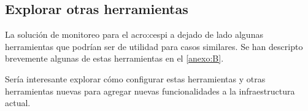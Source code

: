 \subsection{Explorar otras herramientas}
\label{explorar-otras-herramientas}

La solución de monitoreo para el \gls{acro:cespi} a dejado de lado algunas
herramientas que podrían ser de utilidad para casos similares. Se han descripto
brevemente algunas de estas herramientas en el \autoref{anexo:B}.

Sería interesante explorar cómo configurar estas herramientas y otras
herramientas nuevas para agregar nuevas funcionalidades a la infraestructura
actual.
